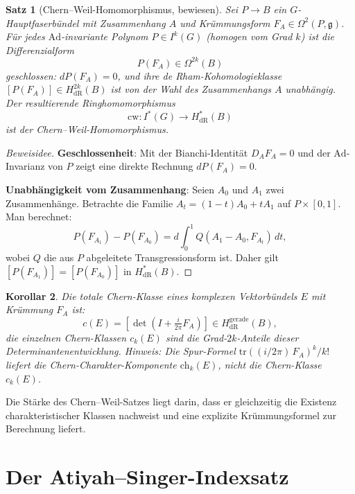 \documentclass[12pt,a4paper]{amsart}
\newtheorem{theorem}{Satz}[section]
\newtheorem{corollary}[theorem]{Korollar}
\theoremstyle{definition}
\begin{document}
\begin{theorem}[Chern--Weil-Homomorphismus, bewiesen]
\label{thm:chernweil}
Sei $P \to B$ ein $G$-Hauptfaserbündel mit Zusammenhang $A$ und Krümmungsform
$F_A \in \Omega^2(P, \mathfrak{g})$. Für jedes $\mathrm{Ad}$-invariante Polynom
$P \in I^k(G)$ (homogen vom Grad $k$) ist die Differenzialform
\[
  P(F_A) \in \Omega^{2k}(B)
\]
geschlossen: $d P(F_A) = 0$, und ihre de Rham-Kohomologieklasse $[P(F_A)] \in
H^{2k}_{\mathrm{dR}}(B)$ ist von der Wahl des Zusammenhangs $A$ unabhängig.
Der resultierende Ringhomomorphismus
\[
  \mathrm{cw} \colon I^*(G) \longrightarrow H^*_{\mathrm{dR}}(B)
\]
ist der \textup{Chern--Weil-Homomorphismus}.
\end{theorem}

\begin{proof}[Beweisidee]
\textbf{Geschlossenheit}: Mit der Bianchi-Identität $D_A F_A = 0$ und der
$\mathrm{Ad}$-Invarianz von $P$ zeigt eine direkte Rechnung $d P(F_A) = 0$.

\textbf{Unabhängigkeit vom Zusammenhang}: Seien $A_0$ und $A_1$ zwei
Zusammenhänge. Betrachte die Familie $A_t = (1-t)A_0 + tA_1$ auf $P \times [0,1]$.
Man berechnet:
\[
  P(F_{A_1}) - P(F_{A_0}) = d\!\int_0^1 Q(A_1 - A_0, F_{A_t})\, dt,
\]
wobei $Q$ die aus $P$ abgeleitete Transgressionsform ist. Daher gilt
$[P(F_{A_1})] = [P(F_{A_0})]$ in $H^*_{\mathrm{dR}}(B)$.
\end{proof}

\begin{corollary}
Die totale Chern-Klasse eines komplexen Vektorbündels $E$ mit Krümmung $F_A$ ist:
\[
  c(E) = \left[\det\!\left(I + \tfrac{i}{2\pi} F_A\right)\right]
  \in H^{\mathrm{gerade}}_{\mathrm{dR}}(B),
\]
die einzelnen Chern-Klassen $c_k(E)$ sind die Grad-$2k$-Anteile dieser Determinantenentwicklung.
Hinweis: Die Spur-Formel $\mathrm{tr}((i/2\pi)\,F_A)^k/k!$ liefert die \emph{Chern-Charakter}-Komponente
$\mathrm{ch}_k(E)$, nicht die Chern-Klasse $c_k(E)$.
\end{corollary}

Die Stärke des Chern--Weil-Satzes liegt darin, dass er gleichzeitig die Existenz
charakteristischer Klassen nachweist und eine explizite Krümmungsformel zur
Berechnung liefert.

\section{Der Atiyah--Singer-Indexsatz}
\label{sec:indexsatz}
\end{document}
